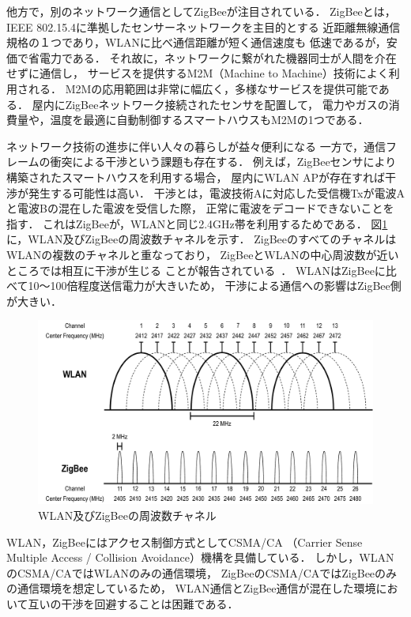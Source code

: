\documentclass[12pt]{jreport}
\begin{document}
他方で，別のネットワーク通信としてZigBeeが注目されている．
ZigBeeとは，IEEE 802.15.4に準拠したセンサーネットワークを主目的とする
近距離無線通信規格の１つであり，WLANに比べ通信距離が短く通信速度も
低速であるが，安価で省電力である．
それ故に，ネットワークに繋がれた機器同士が人間を介在せずに通信し，
サービスを提供するM2M（Machine to Machine）技術によく利用される．
M2Mの応用範囲は非常に幅広く，多様なサービスを提供可能である．
屋内にZigBeeネットワーク接続されたセンサを配置して，
電力やガスの消費量や，温度を最適に自動制御するスマートハウスもM2Mの1つである．

ネットワーク技術の進歩に伴い人々の暮らしが益々便利になる
一方で，通信フレームの衝突による干渉という課題も存在する．
例えば，ZigBeeセンサにより構築されたスマートハウスを利用する場合，
屋内にWLAN APが存在すれば干渉が発生する可能性は高い．
干渉とは，電波技術Aに対応した受信機Txが電波Aと電波Bの混在した電波を受信した際，
正常に電波をデコードできないことを指す．
これはZigBeeが，WLANと同じ2.4GHz帯を利用するためである．
図\ref{fig:frequency}に，WLAN及びZigBeeの周波数チャネルを示す．
ZigBeeのすべてのチャネルはWLANの複数のチャネルと重なっており，
ZigBeeとWLANの中心周波数が近いところでは相互に干渉が生じる
ことが報告されている~\cite{shuaib06:wifi_zigbee}．
WLANはZigBeeに比べて10〜100倍程度送信電力が大きいため，
干渉による通信への影響はZigBee側が大きい．

\begin{figure}[bt]
 \centering
 \includegraphics[width=\columnwidth]{figure/frequency.pdf}
 \caption{WLAN及びZigBeeの周波数チャネル}
 \label{fig:frequency}
\end{figure}

WLAN，ZigBeeにはアクセス制御方式としてCSMA/CA
（Carrier Sense Multiple Access / Collision Avoidance）機構を具備している．
しかし，WLANのCSMA/CAではWLANのみの通信環境，
ZigBeeのCSMA/CAではZigBeeのみの通信環境を想定しているため，
WLAN通信とZigBee通信が混在した環境において互いの干渉を回避することは困難である．
\end{document}
